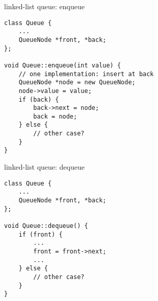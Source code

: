 \begin{frame}[fragile,label=llEnqueue]{linked-list queue: enqueue}
\lstset{language=C++,style=small}
\begin{lstlisting}
class Queue {
    ...
    QueueNode *front, *back;
};

void Queue::enqueue(int value) {
    // one implementation: insert at back
    QueueNode *node = new QueueNode;
    node->value = value;
    if (back) {
        back->next = node;
        back = node;
    } else {
        // other case?
    }
}
\end{lstlisting}
\end{frame}


\begin{frame}[fragile,label=llDequeue]{linked-list queue: dequeue}
\lstset{language=C++,style=small}
\begin{lstlisting}
class Queue {
    ...
    QueueNode *front, *back;
};

void Queue::dequeue() {
    if (front) {
        ...
        front = front->next;
        ...
    } else {
        // other case?
    }
}
\end{lstlisting}
\end{frame}
